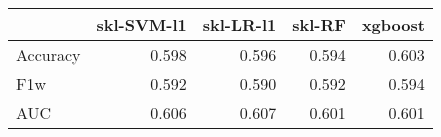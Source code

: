 \begin{tabular}{lrrrr}
\toprule
{} &  skl-SVM-l1 &  skl-LR-l1 &  skl-RF &  xgboost \\
\midrule
Accuracy &       0.598 &      0.596 &   0.594 &    0.603 \\
F1w      &       0.592 &      0.590 &   0.592 &    0.594 \\
AUC      &       0.606 &      0.607 &   0.601 &    0.601 \\
\bottomrule
\end{tabular}
